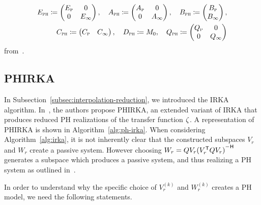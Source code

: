 \begin{equation}\label{eq:prbt-ph-system}
    \begin{aligned}
        E_{\textnormal{\scshape ph}} \coloneqq \begin{pmatrix}
            E_{\textnormal{\scshape p}} & 0 \\
            0 & E_\infty
        \end{pmatrix},\quad A_{\textnormal{\scshape ph}} \coloneqq \begin{pmatrix}
            A_{\textnormal{\scshape p}} & 0 \\
            0 & A_\infty
        \end{pmatrix},\quad B_{\textnormal{\scshape ph}} \coloneqq \begin{pmatrix}
            B_{\textnormal{\scshape p}} \\
            B_\infty
        \end{pmatrix}, \\
        C_{\textnormal{\scshape ph}} \coloneqq \begin{pmatrix}
            C_{\textnormal{\scshape p}} & C_\infty
        \end{pmatrix},\quad D_{\textnormal{\scshape ph}} \coloneqq M_0,\quad Q_{\textnormal{\scshape ph}} \coloneqq \begin{pmatrix}
            Q_{\textnormal{\scshape p}} & 0 \\
            0 & Q_\infty
        \end{pmatrix}
    \end{aligned}
\end{equation}
from~\cite[Lemma~5.6]{CGH2022}.

\subsection{\acl{PHIRKA}}\label{subsec:ph-irka}

In Subsection~\ref{subsec:interpolation-reduction}, we introduced the \ac{IRKA} algorithm.
In~\cite{Gugercin2012}, the authors propose \acf{PHIRKA}, an extended variant of \ac{IRKA} that produces reduced \ac{PH} realizations of the transfer function $\zeta$.
A representation of \ac{PHIRKA} is shown in Algorithm~\ref{alg:ph-irka}.
When considering Algorithm~\ref{alg:irka}, it is not inherently clear that the constructed subspaces $V_r$ and $W_r$ create a passive system.
However choosing $W_r = Q V_r {(V_r\trans Q V_r)}\inv$ generates a subspace which produces a passive system, and thus realizing a \ac{PH} system as outlined in~\cite[Section~2.4]{Breiten2022}.

In order to understand why the specific choice of $V_r^{(k)}$ and $W_r^{(k)}$ creates a \ac{PH} model, we need the following statements.

